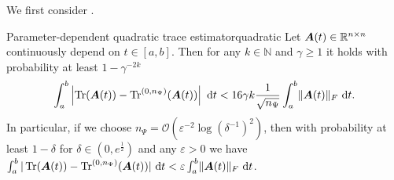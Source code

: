 \documentclass[12pt]{article}
\begin{document}
We first consider .

\begin{theorem}{Parameter-dependent quadratic trace estimator}{quadratic}
    Let $\boldsymbol{A}(t) \in \mathbb{R}^{n \times n}$ continuously depend on $t \in [a, b]$. Then for any $k \in \mathbb{N}$ and $\gamma \geq 1$ it holds with probability at least $1 - \gamma^{-2k}$
    \begin{equation}
        \int_{a}^{b} \left| \operatorname{Tr}(\boldsymbol{A}(t)) - \operatorname{Tr}^{(0, n_{\Psi})}(\boldsymbol{A}(t)) \right| ~\mathrm{d}t < 16 \gamma k \frac{1}{\sqrt{n_{\Psi}}} \int_{a}^{b} \lVert \boldsymbol{A}(t) \rVert _F  ~\mathrm{d}t.
    \end{equation}
    In particular, if we choose $n_{\Psi} = \mathcal{O}(\varepsilon^{-2} \log(\delta^{-1})^2)$, then with probability at least $1-\delta$ for $\delta \in (0, e^{\frac{1}{2}})$ and any $\varepsilon > 0$ we have $\int_{a}^{b} | \operatorname{Tr}(\boldsymbol{A}(t)) - \operatorname{Tr}^{(0, n_{\Psi})}(\boldsymbol{A}(t)) | ~\mathrm{d}t < \varepsilon \int_{a}^{b} \lVert \boldsymbol{A}(t) \rVert _F~\mathrm{d}t$.
\end{theorem}
\end{document}
